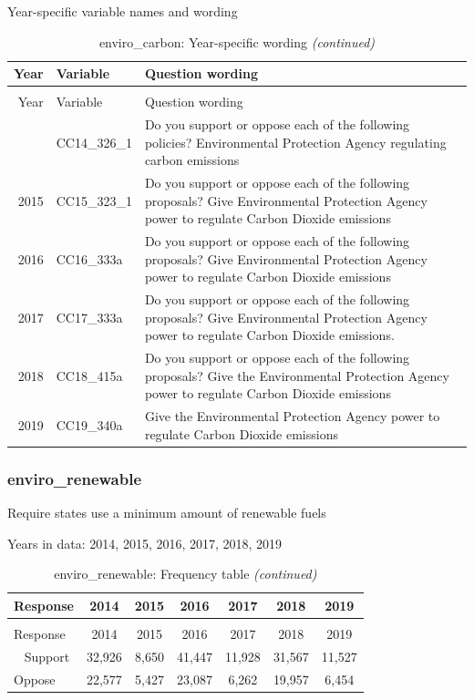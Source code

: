 \documentclass[12pt]{article}
\begin{document}
\endgroup{}

Year-specific variable names and wording

\begin{longtable}[t]{rl>{\raggedright\arraybackslash}p{10cm}}
\caption{\label{tab:unnamed-chunk-4}enviro\_carbon: Year-specific wording}\\
\toprule
Year & Variable & Question wording\\
\midrule
\endfirsthead
\caption[]{enviro\_carbon: Year-specific wording \textit{(continued)}}\\
\toprule
Year & Variable & Question wording\\
\midrule
\endhead
\
\endfoot
\bottomrule
\endlastfoot
2014 & CC14\_326\_1 & Do you support or oppose each of the following policies? Environmental Protection Agency regulating carbon emissions\\
2015 & CC15\_323\_1 & Do you support or oppose each of the following proposals? Give Environmental Protection Agency power to regulate Carbon Dioxide emissions\\
2016 & CC16\_333a & Do you support or oppose each of the following proposals? Give Environmental Protection Agency power to regulate Carbon Dioxide emissions\\
2017 & CC17\_333a & Do you support or oppose each of the following proposals? Give Environmental Protection Agency power to regulate Carbon Dioxide emissions.\\
2018 & CC18\_415a & Do you support or oppose each of the following proposals? Give the Environmental Protection Agency power to regulate Carbon Dioxide emissions\\
2019 & CC19\_340a & Give the Environmental Protection Agency power to regulate Carbon Dioxide emissions\\*
\end{longtable}

\subsubsection{enviro\_renewable}\label{enviro_renewable}

Require states use a minimum amount of renewable fuels

Years in data: 2014, 2015, 2016, 2017, 2018,
2019\begingroup\fontsize{10}{12}\selectfont

\begin{longtable}[t]{lcccccc}
\caption{\label{tab:unnamed-chunk-4}enviro\_renewable: Frequency table}\\
\toprule
Response & 2014 & 2015 & 2016 & 2017 & 2018 & 2019\\
\midrule
\endfirsthead
\caption[]{enviro\_renewable: Frequency table \textit{(continued)}}\\
\toprule
Response & 2014 & 2015 & 2016 & 2017 & 2018 & 2019\\
\midrule
\endhead
\
\endfoot
\bottomrule
\endlastfoot
Support & 32,926 & 8,650 & 41,447 & 11,928 & 31,567 & 11,527\\
Oppose & 22,577 & 5,427 & 23,087 & 6,262 & 19,957 & 6,454\\*
\end{longtable}
\end{document}
